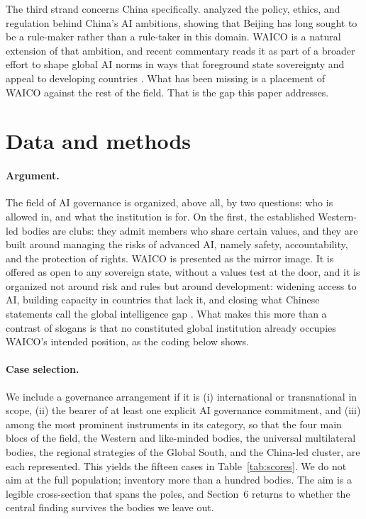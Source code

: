 \documentclass[11pt]{article}
\begin{document}
The third strand concerns China specifically. \citet{roberts2021chinese} analyzed the policy, ethics, and regulation behind China's AI ambitions, showing that Beijing has long sought to be a rule-maker rather than a rule-taker in this domain. WAICO is a natural extension of that ambition, and recent commentary reads it as part of a broader effort to shape global AI norms in ways that foreground state sovereignty and appeal to developing countries \citep{basu2026pivot, nature2025china}. What has been missing is a placement of WAICO against the rest of the field. That is the gap this paper addresses.

\section{Data and methods}
\paragraph{Argument.} The field of AI governance is organized, above all, by two questions: who is allowed in, and what the institution is for. On the first, the established Western-led bodies are clubs: they admit members who share certain values, and they are built around managing the risks of advanced AI, namely safety, accountability, and the protection of rights. WAICO is presented as the mirror image. It is offered as open to any sovereign state, without a values test at the door, and it is organized not around risk and rules but around development: widening access to AI, building capacity in countries that lack it, and closing what Chinese statements call the global intelligence gap \citep{govcn2025waic, govcn2025waiczh, mfa2025actionplan, mfa2025actionplanzh, mfa2023initiative}. What makes this more than a contrast of slogans is that no constituted global institution already occupies WAICO's intended position, as the coding below shows.

\paragraph{Case selection.} We include a governance arrangement if it is (i) international or transnational in scope, (ii) the bearer of at least one explicit AI governance commitment, and (iii) among the most prominent instruments in its category, so that the four main blocs of the field, the Western and like-minded bodies, the universal multilateral bodies, the regional strategies of the Global South, and the China-led cluster, are each represented. This yields the fifteen cases in Table~\ref{tab:scores}. We do not aim at the full population; \citet{geith2025emerging} inventory more than a hundred bodies. The aim is a legible cross-section that spans the poles, and Section~6 returns to whether the central finding survives the bodies we leave out.
\end{document}
